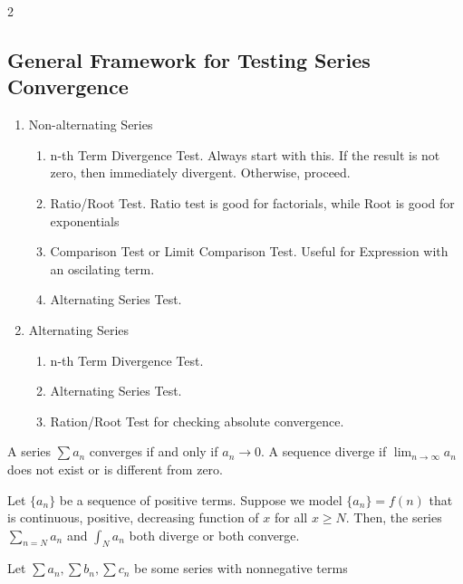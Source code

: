 \documentclass[5pt, a4paper]{article}
\begin{document}
\begin{multicols}{2}
   \subsection*{General Framework for Testing Series Convergence}
  \begin{enumerate}
      \item Non-alternating Series
          \begin{enumerate}
              \item n-th Term Divergence Test. 
                  Always start with this. If the result is not zero, then immediately
                  divergent. Otherwise, proceed.
              \item Ratio/Root Test.  
                  Ratio test is good for factorials, while Root is good for
                  exponentials
              \item Comparison Test or Limit Comparison Test. Useful for Expression
                  with an oscilating term.
              \item Alternating Series Test.
          \end{enumerate}
      \item Alternating Series
          \begin{enumerate}
              \item n-th Term Divergence Test. 
              \item Alternating Series Test. 
                \item Ration/Root Test for checking absolute convergence.
          \end{enumerate}
  \end{enumerate} 
   \begin{tcolorbox}[title= n-th Term Convergence Test]
       A series $\sum a_n$ converges if and only if $a_n \to 0$. A sequence diverge if
       $\lim_{n \to \infty} a_n$ does not exist or is different from zero.
   \end{tcolorbox}
   \begin{tcolorbox}[title=The Integral Test (Extra JIC)]
       Let $\{a_n\} $ be a sequence of positive terms. Suppose we model $\{a_n\}
       = f(n)$ that is continuous, positive, decreasing function of $x$ for all
       $x \ge N$. Then, the series $\sum_{n=N} a_n$ and $\int_N a_n$ both
       diverge or both converge.
   \end{tcolorbox}
   \begin{tcolorbox}[title=Comparison Test]
       Let $\sum a_n, \sum b_n, \sum c_n$ be some series with nonnegative terms

\end{tcolorbox}
\end{multicols}
\end{document}
